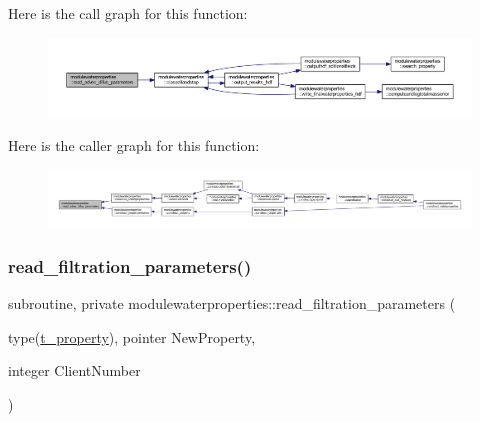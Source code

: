 Here is the call graph for this function\+:\nopagebreak
\begin{figure}[H]
\begin{center}
\leavevmode
\includegraphics[width=350pt]{namespacemodulewaterproperties_a178c0df0a5c46c1d129d7dfd6e6982fc_cgraph}
\end{center}
\end{figure}
Here is the caller graph for this function\+:\nopagebreak
\begin{figure}[H]
\begin{center}
\leavevmode
\includegraphics[width=350pt]{namespacemodulewaterproperties_a178c0df0a5c46c1d129d7dfd6e6982fc_icgraph}
\end{center}
\end{figure}
\mbox{\label{namespacemodulewaterproperties_ace6684fcd5340a736f01034eee0565cd}} 
\subsubsection{\texorpdfstring{read\+\_\+filtration\+\_\+parameters()}{read\_filtration\_parameters()}}
{\footnotesize\ttfamily subroutine, private modulewaterproperties\+::read\+\_\+filtration\+\_\+parameters (\begin{DoxyParamCaption}\item[{type(\mbox{\hyperlink{structmodulewaterproperties_1_1t__property}{t\+\_\+property}}), pointer}]{New\+Property,  }\item[{integer}]{Client\+Number }\end{DoxyParamCaption})\hspace{0.3cm}{\ttfamily [private]}}

